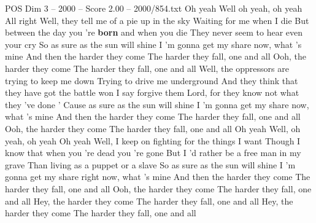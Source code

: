 \begin{textsample}{POS Dim 3 – 2000 – Score 2.00 – 2000/854.txt}  \label{ex:f3_pos_032}
Oh yeah Well oh yeah, oh yeah All right Well, they tell me of a pie up in the sky Waiting for me when I die But between the day you 're \textbf{born} and when you die They never seem to hear even your cry So as sure as the sun will shine I 'm gonna get my share now, what 's mine And then the harder they come The harder they fall, one and all Ooh, the harder they come The harder they fall, one and all Well, the oppressors are trying to keep me down Trying to drive me underground And they think that they have got the battle won I say forgive them Lord, for they know not what they 've done ' Cause as sure as the sun will shine I 'm gonna get my share now, what 's mine And then the harder they come The harder they fall, one and all Ooh, the harder they come The harder they fall, one and all Oh yeah Well, oh yeah, oh yeah Oh yeah Well, I keep on fighting for the things I want Though I know that when you 're dead you 're gone But I 'd rather be a free man in my grave Than living as a puppet or a slave So as sure as the sun will shine I 'm gonna get my share right now, what 's mine And then the harder they come The harder they fall, one and all Ooh, the harder they come The harder they fall, one and all Hey, the harder they come The harder they fall, one and all Hey, the harder they come The harder they fall, one and all

\end{textsample}
